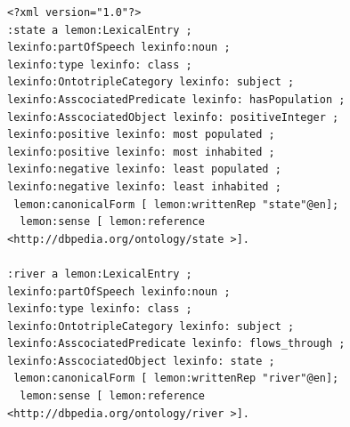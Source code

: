 \documentclass[review]{elsarticle}
\begin{document}
\begin{lstlisting}[caption= Sample lexicon created from the ontology in Listing 7,
    basicstyle=\footnotesize
]
<?xml version="1.0"?>
:state a lemon:LexicalEntry ;
lexinfo:partOfSpeech lexinfo:noun ;
lexinfo:type lexinfo: class ;
lexinfo:OntotripleCategory lexinfo: subject ;
lexinfo:AsscociatedPredicate lexinfo: hasPopulation ;
lexinfo:AsscociatedObject lexinfo: positiveInteger ;
lexinfo:positive lexinfo: most populated ;
lexinfo:positive lexinfo: most inhabited ;
lexinfo:negative lexinfo: least populated ;
lexinfo:negative lexinfo: least inhabited ;
 lemon:canonicalForm [ lemon:writtenRep "state"@en];
  lemon:sense [ lemon:reference
<http://dbpedia.org/ontology/state >].

:river a lemon:LexicalEntry ;
lexinfo:partOfSpeech lexinfo:noun ;
lexinfo:type lexinfo: class ;
lexinfo:OntotripleCategory lexinfo: subject ;
lexinfo:AsscociatedPredicate lexinfo: flows_through ;
lexinfo:AsscociatedObject lexinfo: state ;
 lemon:canonicalForm [ lemon:writtenRep "river"@en];
  lemon:sense [ lemon:reference
<http://dbpedia.org/ontology/river >].
\end{lstlisting}
\end{document}
